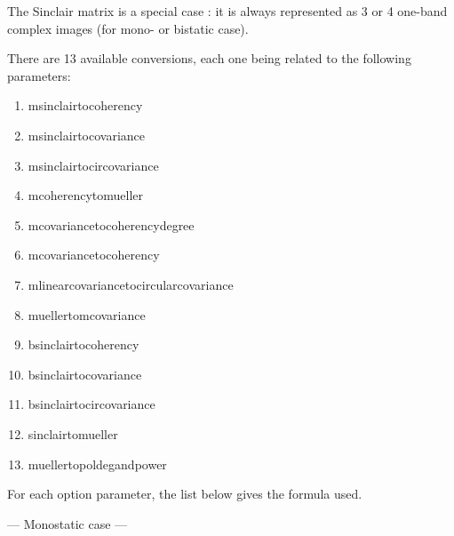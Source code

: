 The Sinclair matrix is a special case : it is always represented as 3 or 4
one-band complex images (for mono- or bistatic case).

There are 13 available conversions, each one being related to the following  parameters:
\begin{enumerate}
\item msinclairtocoherency
\item msinclairtocovariance
\item msinclairtocircovariance
\item mcoherencytomueller
\item mcovariancetocoherencydegree
\item mcovariancetocoherency
\item mlinearcovariancetocircularcovariance
\item muellertomcovariance
\item bsinclairtocoherency
\item bsinclairtocovariance
\item bsinclairtocircovariance
\item sinclairtomueller
\item muellertopoldegandpower
\end{enumerate}

For each option parameter, the list below gives the formula used.

--- Monostatic case ---

